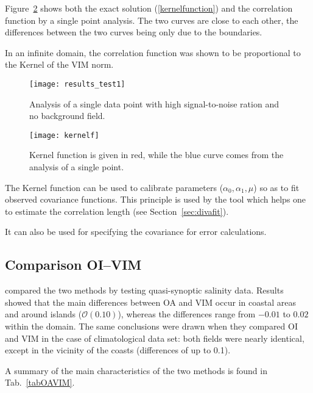 Figure~\ref{kernel1} shows both the exact solution (\ref{kernelfunction}) and the correlation function by a single point analysis. The two curves are close to each other, the differences between the two curves being only due to the boundaries.

In an infinite domain, the correlation function was shown to be proportional to the Kernel of the VIM norm.

\begin{figure}[H]
\centering
\texttt{[image: results\_test1]}
\caption{Analysis of a single data point with high signal-to-noise ration and no background field.\label{singleanalysis}}
\end{figure}

\begin{figure}[H]
\centering
\texttt{[image: kernelf]}
\caption{Kernel function is given in red, while the blue curve comes from the analysis of a single point.\label{kernel1}}
\end{figure}


The Kernel function can be used to calibrate \diva parameters ($\alpha_0, \alpha_1, \mu$) so as to fit observed covariance functions. This principle is used by the tool  which helps one to estimate the correlation length (see Section~\ref{sec:divafit}).

It can also be used for specifying the covariance for error calculations.%





\subsection{Comparison OI--VIM}

\cite{RIXEN00} compared the two methods by testing quasi-synoptic salinity data. Results showed that the main differences between OA and VIM occur in coastal areas and around islands ($\mathcal{O}(0.10)$), whereas the differences range from $-0.01$ to $0.02$ within the domain. The same conclusions were drawn when they compared OI and VIM in the case of climatological data set: both fields were nearly identical, except in the vicinity of the coasts (differences of up to 0.1).

A summary of the main characteristics of the two methods is found in Tab.~\ref{tabOAVIM}.


